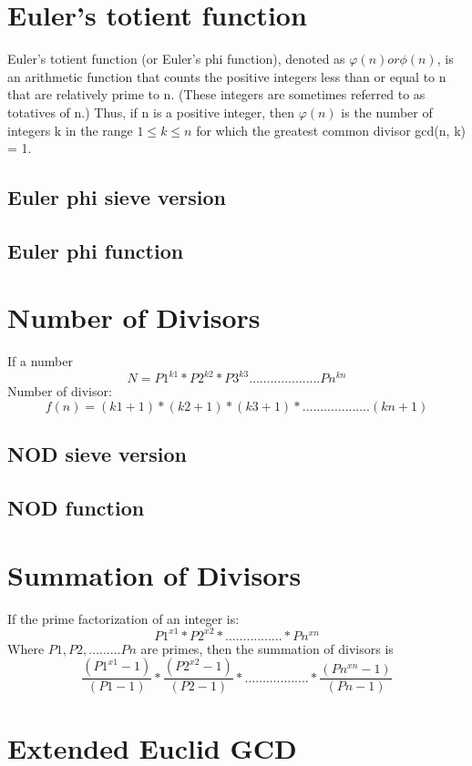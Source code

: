 \documentclass[11pt]{report}
\begin{document}
\section{Euler's totient function}
Euler's totient function (or Euler's phi function), denoted as $\varphi (n) or  \phi(n)$, is an arithmetic function that counts the positive integers less than or equal to n that are relatively prime to n. (These integers are sometimes referred to as totatives of n.) Thus, if n is a positive integer, then $\varphi (n)$ is the number of integers k in the range $1 \leq k \leq n$ for which the greatest common divisor gcd(n, k) = 1.
\subsection{Euler phi sieve version}

\subsection{Euler phi function}

\section{Number of Divisors}
If a number $$N= P1^{k1}*P2^{k2}*P3^{k3}………...........Pn^{kn}$$
Number of divisor: $$f(n)=(k1+1)*(k2+1)*(k3+1)*…….........….(kn+1)$$
\subsection{NOD sieve version}

\subsection{NOD function}

\section{Summation of Divisors}
If the prime factorization of an integer is:
		$$P1^{x1}*P2^{x2}*…….....…..*Pn^{xn}$$
Where $P1,P2,………Pn$ are primes, then the summation of divisors is
		$$\frac{(P1^{x1}  -1)}{(P1-1)} * \frac{(P2^{x2}  -1)}{(P2-1)} *………......... *\frac{(Pn^{xn}  -1)}{(Pn-1)}$$
\section{Extended Euclid GCD}

\end{document}
